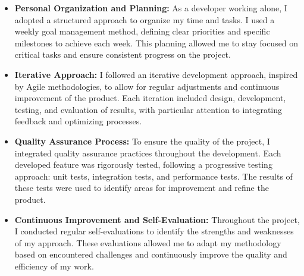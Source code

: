 \begin{itemize}
    \item \textbf{Personal Organization and Planning:} As a developer working alone, I adopted a structured approach to organize my time and tasks. I used a weekly goal management method, defining clear priorities and specific milestones to achieve each week. This planning allowed me to stay focused on critical tasks and ensure consistent progress on the project.

    \item \textbf{Iterative Approach:} I followed an iterative development approach, inspired by Agile methodologies, to allow for regular adjustments and continuous improvement of the product. Each iteration included design, development, testing, and evaluation of results, with particular attention to integrating feedback and optimizing processes.

    \item \textbf{Quality Assurance Process:} To ensure the quality of the project, I integrated quality assurance practices throughout the development. Each developed feature was rigorously tested, following a progressive testing approach: unit tests, integration tests, and performance tests. The results of these tests were used to identify areas for improvement and refine the product.

    \item \textbf{Continuous Improvement and Self-Evaluation:} Throughout the project, I conducted regular self-evaluations to identify the strengths and weaknesses of my approach. These evaluations allowed me to adapt my methodology based on encountered challenges and continuously improve the quality and efficiency of my work.
\end{itemize}

